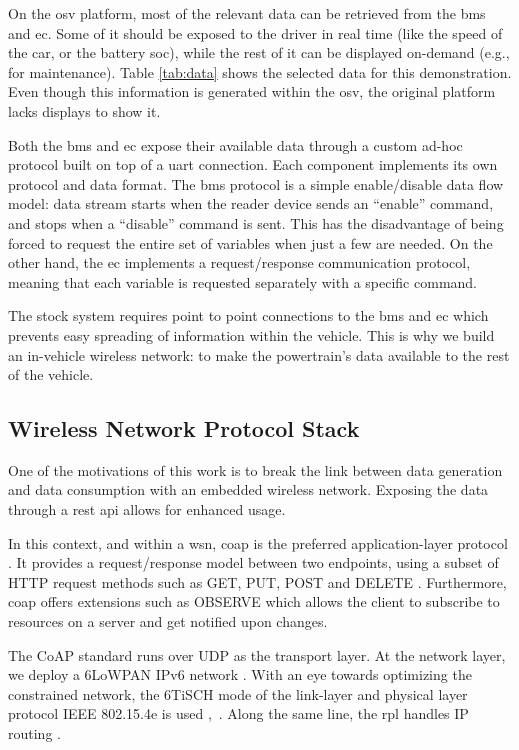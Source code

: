 \documentclass[runningheads]{llncs}
\begin{document}
On the \gls{osv} platform, most of the relevant data can be retrieved from the \gls{bms} and \gls{ec}.
Some of it should be exposed to the
driver in real time (like the speed of the car, or the battery \gls{soc}), while the rest of it can be displayed on-demand (e.g., for maintenance).
Table \ref{tab:data} shows the selected data for this demonstration.
Even though this information is generated within the \gls{osv}, 
the original platform lacks displays to show it.

Both the \gls{bms} and \gls{ec} expose their available data through a custom
ad-hoc protocol built on top of a \gls{uart} connection.
Each component implements its own protocol and data format.
The \gls{bms} protocol is a simple enable/disable data flow model: data stream
starts when the reader device sends an ``enable'' command, and stops when a
``disable'' command is sent.
This has the disadvantage of being forced to request the entire set of variables when just a few are needed.
On the other hand, the \gls{ec} implements a request/response communication
protocol, meaning that each variable is requested separately with a specific
command.

The stock system requires point to point connections to the \gls{bms} and \gls{ec} which prevents easy spreading of information within the vehicle.
This is why we build an in-vehicle wireless network: to make the powertrain's data available to the rest of the vehicle.



\subsection{Wireless Network Protocol Stack}
\label{subsec:protocol-stack}

One of the motivations of this work is to break the link between data generation and data consumption with an embedded wireless network.
Exposing the data through a \gls{rest} \gls{api} allows for enhanced usage.


In this context, and within a \gls{wsn}, \gls{coap} is the preferred application-layer protocol \cite{RFC7252}.
It provides a request/response model between two endpoints, using a subset of HTTP request methods such as GET, PUT, POST and DELETE \cite{RFC7231}.
Furthermore, \gls{coap} offers extensions such as OBSERVE which allows the
client to subscribe to resources on a server and get notified upon changes.


The CoAP standard runs over UDP as the transport layer.
At the network layer, we deploy a 6LoWPAN IPv6 network \cite{RFC4944}.
With an eye towards optimizing the constrained network, the 6TiSCH mode of
the link-layer and physical layer protocol IEEE 802.15.4e is used \cite{RFC8180},~\cite{802-15-4}.
Along the same line, the \gls{rpl} handles IP routing \cite{RFC6550}.
\end{document}
